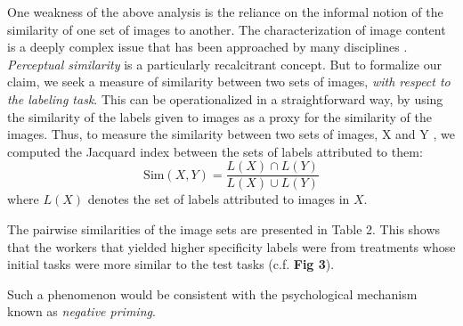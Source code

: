 \documentclass[12pt]{article}
\begin{document}
One weakness of the above analysis is the reliance on the informal notion
of the similarity of one set of images to another. The 
characterization of image content is a deeply complex issue that has been 
approached by many disciplines \cite{panofsky1939studies,shatford1986analyzing,Tversky1977327,Jaimes20002}. \textit{Perceptual similarity} is a 
particularly recalcitrant concept.   But to formalize our claim, we seek a 
measure of similarity between two sets of images, 
\textit{with respect to the labeling task}.  This can be operationalized
in a straightforward way, by using the similarity of the labels given to images
as a proxy for the similarity of the images.  Thus, to measure the 
similarity between two sets of images, X and Y , we computed the Jacquard 
index between the sets of labels attributed to them:
$$
	\mathrm{Sim}(X,Y) = \frac{L(X) \cap L(Y)}{L(X) \cup L(Y)}
$$
where $L(X)$ denotes the set of labels attributed to images in $X$.

The pairwise similarities of the image sets are presented in Table 2. This 
shows that the workers that yielded higher specificity labels were from 
treatments whose initial tasks were more similar to the test tasks (c.f.
\textbf{Fig 3}).

Such a phenomenon would be consistent with the psychological mechanism known as
\textit{negative priming}.
\end{document}
